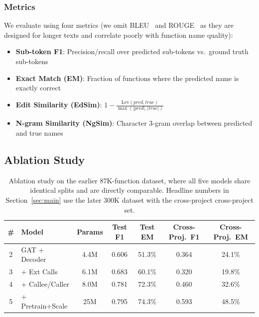 \documentclass[sigconf,nonacm]{acmart}
\begin{document}
\subsubsection{Metrics}
We evaluate using four metrics (we omit BLEU~\cite{bleu} and ROUGE~\cite{rouge} as they are designed for longer texts and correlate poorly with function name quality):
\begin{itemize}
    \item \textbf{Sub-token F1}: Precision/recall over predicted sub-tokens vs.\ ground truth sub-tokens
    \item \textbf{Exact Match (EM)}: Fraction of functions where the predicted name is exactly correct
    \item \textbf{Edit Similarity (EdSim)}: $1 - \frac{\text{Lev}(pred, true)}{\max(|pred|, |true|)}$
    \item \textbf{N-gram Similarity (NgSim)}: Character 3-gram overlap between predicted and true names
\end{itemize}

\subsection{Ablation Study}
\label{sec:ablation}

\begin{table}[t]
    \centering
    \caption{Ablation study on the earlier 87K-function dataset, where all five models share identical splits and are directly comparable. Headline numbers in Section~\ref{sec:main} use the later 300K dataset with the cross-project cross-project set.}
    \label{tab:ablation}
    \footnotesize
    \setlength{\tabcolsep}{4pt}
    \begin{tabular}{clccccc}
        \toprule
        \textbf{\#} & \textbf{Model} & \textbf{Params} & \textbf{Test F1} & \textbf{Test EM} & \textbf{Cross-Proj.\ F1} & \textbf{Cross-Proj.\ EM} \\
        \midrule
        2 & GAT + Decoder & 4.4M & 0.606 & 51.3\% & 0.364 & 24.1\% \\
        3 & + Ext Calls & 6.1M & 0.683 & 60.1\% & 0.320 & 19.8\% \\
        4 & + Callee/Caller & 8.0M & 0.781 & 72.3\% & 0.460 & 32.6\% \\
        5 & + Pretrain+Scale & 25M & 0.795 & 74.3\% & 0.593 & 48.5\% \\
        \bottomrule
    \end{tabular}
\end{table}
\end{document}
